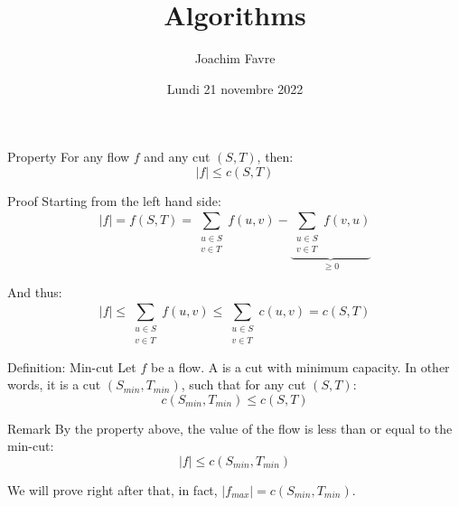 \documentclass[a4paper]{article}
\title{Algorithms}
\author{Joachim Favre}
\date{Lundi 21 novembre 2022}
\begin{document}
\maketitle


\begin{parag}{Property}
    For any flow $f$ and any cut $\left(S, T\right)$, then: 
    \[\left|f\right| \leq c\left(S, T\right)\]
    
    \begin{subparag}{Proof}
        Starting from the left hand side:
        \[\left|f\right| = f\left(S, T\right) = \sum_{\substack{u \in S \\ v \in T}}^{} f\left(u, v\right) - \underbrace{\sum_{\substack{u \in S\\ v \in T}}^{} f\left(v, u\right)}_{\geq 0}\]

        And thus: 
        \[\left|f\right| \leq \sum_{\substack{u \in S \\ v \in T}}^{} f\left(u, v\right) \leq \sum_{\substack{u \in S \\ v \in T}}^{} c\left(u, v\right) = c\left(S, T\right)\]
    \end{subparag}
\end{parag}

\begin{parag}{Definition: Min-cut}
    Let $f$ be a flow. A  is a cut with minimum capacity. In other words, it is a cut $\left(S_{min}, T_{min}\right)$, such that for any cut $\left(S, T\right)$: 
    \[c\left(S_{min}, T_{min}\right) \leq c\left(S, T\right)\]

    \begin{subparag}{Remark}
        By the property above, the value of the flow is less than or equal to the min-cut: 
        \[\left|f\right| \leq c\left(S_{min}, T_{min}\right)\]

        We will prove right after that, in fact, $\left|f_{max}\right| = c\left(S_{min}, T_{min}\right)$.
    \end{subparag}
\end{parag}
\end{document}
